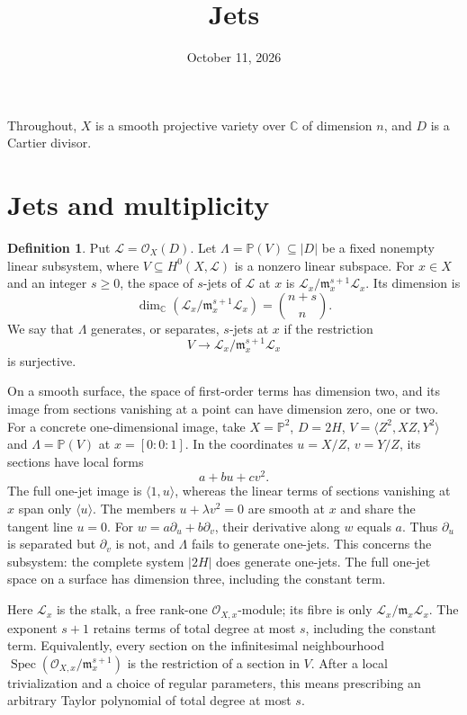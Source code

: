 \documentclass[12pt,a4paper,psamsfonts]{amsart}
\title{Jets}
\date{October 11, 2026}
\theoremstyle{definition}
\newtheorem{definition}[lemma]{Definition}
\newcommand{\OO}{\mathcal O}
\newcommand{\C}{\mathbb C}
\begin{document}
\maketitle
Throughout, $X$ is a smooth projective variety over $\C$ of dimension $n$,
and $D$ is a Cartier divisor.

\section{Jets and multiplicity}
\begin{definition}
Put $\mathcal L=\OO_X(D)$.
Let $\Lambda=\mathbb P(V)\subseteq|D|$ be a fixed nonempty linear
subsystem, where $V\subseteq H^0(X,\mathcal L)$ is a nonzero linear
subspace. For $x\in X$ and an integer $s\ge0$, the space of $s$-jets of $\mathcal L$
at $x$ is $\mathcal L_x/\mathfrak m_x^{s+1}\mathcal L_x$.
Its dimension is
\[
 \dim_{\C}(\mathcal L_x/\mathfrak m_x^{s+1}\mathcal L_x)
 =\binom{n+s}{n}.
\]
We say that $\Lambda$ generates, or separates, $s$-jets at $x$ if the restriction
\[
 V\longrightarrow
 \mathcal L_x/\mathfrak m_x^{s+1}\mathcal L_x
\]
is surjective.
\end{definition}
On a smooth surface, the space of first-order terms has dimension two,
and its image from sections vanishing at a point can have dimension
zero, one or two. For a concrete one-dimensional image, take
$X=\mathbb P^2$, $D=2H$, $V=\langle Z^2,XZ,Y^2\rangle$ and
$\Lambda=\mathbb P(V)$ at $x=[0:0:1]$. In the coordinates
$u=X/Z$, $v=Y/Z$, its sections have local forms
\[
 a+bu+cv^2.
\]
The full one-jet image is $\langle1,u\rangle$, whereas the linear terms
of sections vanishing at $x$ span only $\langle u\rangle$.
The members $u+\lambda v^2=0$ are smooth at $x$ and share the tangent
line $u=0$. For $w=a\partial_u+b\partial_v$, their derivative along
$w$ equals $a$. Thus $\partial_u$ is separated but $\partial_v$ is not,
and $\Lambda$ fails to generate one-jets. This concerns the subsystem:
the complete system $|2H|$ does generate one-jets. The full one-jet
space on a surface has dimension three, including the constant term.


Here $\mathcal L_x$ is the stalk, a free rank-one $\OO_{X,x}$-module;
its fibre is only $\mathcal L_x/\mathfrak m_x\mathcal L_x$.
The exponent $s+1$ retains terms of total degree at most $s$, including
 the constant term. Equivalently, every section on the infinitesimal
neighbourhood $\operatorname{Spec}(\OO_{X,x}/\mathfrak m_x^{s+1})$
is the restriction of a section in $V$. After a local trivialization
and a choice of regular parameters, this means prescribing an arbitrary
Taylor polynomial of total degree at most $s$.
\end{document}
